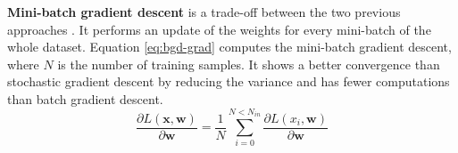 \textbf{Mini-batch gradient descent} is a trade-off between the two previous approaches \cite{ruder_overview_2017, matteucci_artificial_2019}. It performs an update of the weights for every mini-batch of the whole dataset. Equation \eqref{eq:bgd-grad} computes the mini-batch gradient descent, where $N$ is the number of training samples. It shows a better convergence than stochastic gradient descent by reducing the variance and has fewer computations than batch gradient descent.
%
\begin{equation}
    \frac{ \partial L( \boldsymbol{x}, \boldsymbol{w} ) }{\partial \boldsymbol{w}} = \frac{1}{N} \sum^{N < N_{in}}_{i = 0} \frac{ \partial L( x_i, \boldsymbol{w} ) }{\partial \boldsymbol{w}}
    \label{eq:bgd-grad}
\end{equation}
